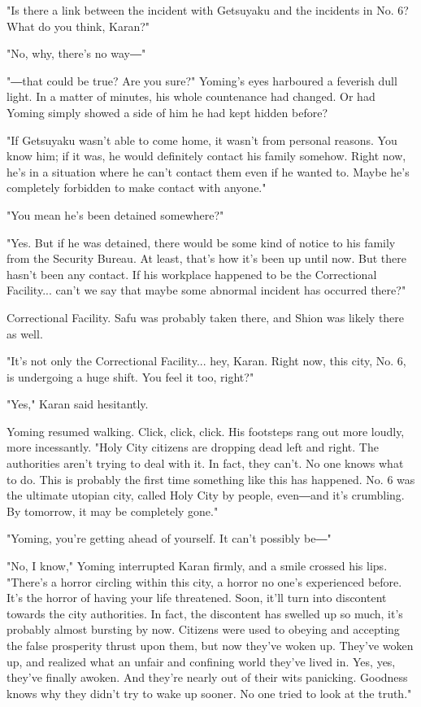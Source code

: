 "Is there a link between the incident with Getsuyaku and the incidents
in No. 6? What do you think, Karan?"

"No, why, there's no way―"

"―that could be true? Are you sure?" Yoming's eyes harboured a feverish
dull light. In a matter of minutes, his whole countenance had changed.
Or had Yoming simply showed a side of him he had kept hidden before?

"If Getsuyaku wasn't able to come home, it wasn't from personal reasons.
You know him; if it was, he would definitely contact his family somehow.
Right now, he's in a situation where he can't contact them even if he
wanted to. Maybe he's completely forbidden to make contact with anyone."

"You mean he's been detained somewhere?"

"Yes. But if he was detained, there would be some kind of notice to his
family from the Security Bureau. At least, that's how it's been up until
now. But there hasn't been any contact. If his workplace happened to be
the Correctional Facility... can't we say that maybe some abnormal
incident has occurred there?"

Correctional Facility. Safu was probably taken there, and Shion was
likely there as well.

"It's not only the Correctional Facility... hey, Karan. Right now, this
city, No. 6, is undergoing a huge shift. You feel it too, right?"

"Yes," Karan said hesitantly.

Yoming resumed walking. Click, click, click. His footsteps rang out more
loudly, more incessantly. "Holy City citizens are dropping dead left and
right. The authorities aren't trying to deal with it. In fact, they
can't. No one knows what to do. This is probably the first time
something like this has happened. No. 6 was the ultimate utopian city,
called Holy City by people, even―and it's crumbling. By tomorrow, it may
be completely gone."

"Yoming, you're getting ahead of yourself. It can't possibly be―"

"No, I know," Yoming interrupted Karan firmly, and a smile crossed his
lips. "There's a horror circling within this city, a horror no one's
experienced before. It's the horror of having your life threatened.
Soon, it'll turn into discontent towards the city authorities. In fact,
the discontent has swelled up so much, it's probably almost bursting by
now. Citizens were used to obeying and accepting the false prosperity
thrust upon them, but now they've woken up. They've woken up, and
realized what an unfair and confining world they've lived in. Yes, yes,
they've finally awoken. And they're nearly out of their wits panicking.
Goodness knows why they didn't try to wake up sooner. No one tried to
look at the truth."


